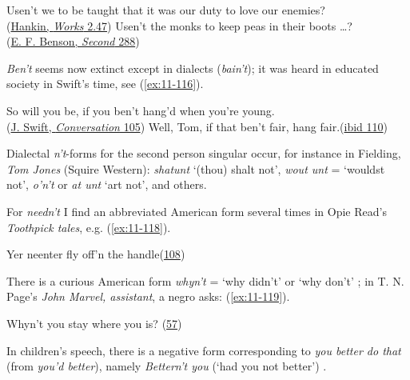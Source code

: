 \ex Usen't we to be taught that it was our duty to love our enemies?\\\hfill(\href{https://archive.org/details/dramaticworksofs02hank/page/32/mode/2up?q=%22usen%27t+we%22&view=theater}{Hankin, \textit{Works} 2.47})
\ex Usen't the monks to keep peas in their boots {\dots}?\\\hfill(\href{https://archive.org/details/dodosecond00bensiala/page/266/mode/2up?view=theater&q=%22monks+to+keep+peas%22}{E. F. Benson, \textit{Second} 288}) %
\z
\z

\bigskip

\textit{Ben't} seems now extinct except in dialects (\textit{bain't}); it was heard in educated society in Swift's time, see (\ref{ex:11-116}). 

\ea \label{ex:11-116}
\ea
So will you be, if you ben't hang'd when you're young.\\\hfill(\href{https://archive.org/details/cu31924013200898/page/n139/mode/2up?q=%22ben%27t+hang%27d%22&view=theater}{J. Swift, \textit{Conversation} 105}) %
\ex
Well, Tom, if that ben't fair, hang fair.\hfill(\href{https://archive.org/details/cu31924013200898/page/n145/mode/2up?q=%22hang+fair%22&view=theater}{ibid 110}) %
\z
\z

Dialectal \textit{n't}-forms for the second person singular occur, for instance in Fielding, \textit{Tom Jones} (Squire Western): \textit{shatunt} `(thou) shalt not', \textit{wout unt} = `wouldst not', \textit{o'n't} or \textit{at unt} `art not', and others. 


For \textit{needn't} I find an abbreviated American form several times in Opie Read's \textit{Toothpick tales}, e.g. (\ref{ex:11-118}).

\ea \label{ex:11-118}
Yer neenter fly off'n the handle\hfill(\href{https://archive.org/details/toothpicktales00readgoog/page/n114/mode/2up?view=theater&q=%22yer+neenter%22}{108})
\z

There is a curious American form \textit{whyn't} = `why didn't' or `why don't' \citep{payne1909wordlist}; in T. N. Page's \textit{John Marvel, assistant}, a negro asks: (\ref{ex:11-119}).

\ea \label{ex:11-119}
Whyn't you stay where you is? \hfill (\href{https://archive.org/details/johnmarvelassist00page_0/page/56/mode/2up?view=theater&q=%22you+stay+where%22}{57})
\z

In children's speech, there is a negative form corresponding to \textit{you better do that} (from \textit{you'd better}), namely \textit{Bettern't you} (`had you not better') \citep[\href{https://archive.org/details/studiesofchildho02sull/page/176/mode/2up?view=theater\&q=\%22bettern\%27t\%22}{177}]{sully1903studies}.



